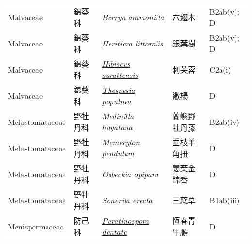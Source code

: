 {\begin{longtable}{L{2.5cm}L{2cm}L{5cm}L{2.5cm}L{3cm}}
    Malvaceae & 錦葵科 & \href{http://www.theplantlist.org/tpl1.1/search?q=Berrya+ammonilla}{\textit{Berrya ammonilla} } & 六翅木 & B2ab(v); D    \\
    Malvaceae & 錦葵科 & \href{http://www.theplantlist.org/tpl1.1/search?q=Heritiera+littoralis}{\textit{Heritiera littoralis} } & 銀葉樹 & B2ab(v); D    \\
    Malvaceae & 錦葵科 & \href{http://www.theplantlist.org/tpl1.1/search?q=Hibiscus+surattensis}{\textit{Hibiscus surattensis} } & 刺芙蓉 & C2a(i)    \\
    Malvaceae & 錦葵科 & \href{http://www.theplantlist.org/tpl1.1/search?q=Thespesia+populnea}{\textit{Thespesia populnea} } & 繖楊 & D    \\
    Melastomataceae & 野牡丹科 & \href{http://www.theplantlist.org/tpl1.1/search?q=Medinilla+hayatana}{\textit{Medinilla hayatana} } & 蘭嶼野牡丹藤 & B2ab(iv)    \\
    Melastomataceae & 野牡丹科 & \href{http://www.theplantlist.org/tpl1.1/search?q=Memecylon+pendulum}{\textit{Memecylon pendulum} } & 垂枝羊角扭 & D    \\
    Melastomataceae & 野牡丹科 & \href{http://www.theplantlist.org/tpl1.1/search?q=Osbeckia+opipara}{\textit{Osbeckia opipara} } & 闊葉金錦香 & D    \\
    Melastomataceae & 野牡丹科 & \href{http://www.theplantlist.org/tpl1.1/search?q=Sonerila+erecta}{\textit{Sonerila erecta} } & 三蕊草 & B1ab(iii)    \\
    Menispermaceae & 防己科 & \href{http://www.theplantlist.org/tpl1.1/search?q=Paratinospora+dentata}{\textit{Paratinospora dentata} } & 恆春青牛膽 & D    \\

\end{longtable}}

